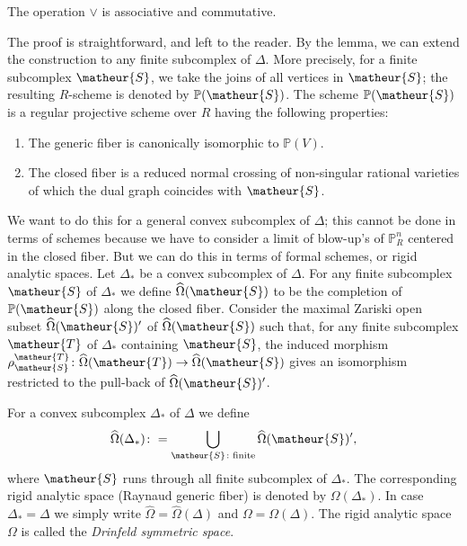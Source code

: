 \begin{applem}
The operation $\vee$ is associative and commutative.
\end{applem}

The proof is straightforward, and left to the reader. 
By the lemma, we can extend the construction to any finite subcomplex of
$\Delta$.
More precisely, for a finite subcomplex $\matheur{S}$, we take the joins 
of all vertices in $\matheur{S}$; the resulting $R$-scheme is denoted by 
$\mathbb{P}(\matheur{S})$.
The scheme $\mathbb{P}(\matheur{S})$ is a regular projective scheme over
$R$ having the following properties:
\begin{enumerate}
\item The generic fiber is canonically isomorphic to $\mathbb{P}(V)$.
\item The closed fiber is a reduced normal crossing of non-singular
      rational varieties of which the dual graph coincides with
      $\matheur{S}$.
\end{enumerate}

We want to do this for a general convex subcomplex of $\Delta$; this cannot 
be done in terms of schemes because we have to consider a limit of
blow-up's of $\mathbb{P}^n_R$ centered in the closed fiber.
But we can do this in terms of formal schemes, or rigid analytic spaces.
Let $\Delta_{\ast}$ be a convex subcomplex of $\Delta$.
For any finite subcomplex $\matheur{S}$ of $\Delta_{\ast}$ we define 
$\widehat{\Omega}(\matheur{S})$ to be the completion of
$\mathbb{P}(\matheur{S})$ along the closed fiber.
Consider the maximal Zariski open subset $\widehat{\Omega}(\matheur{S})'$
of $\widehat{\Omega}(\matheur{S})$ such that, for any finite subcomplex
$\matheur{T}$ of $\Delta_{\ast}$ containing $\matheur{S}$, the induced
morphism $\rho^{\matheur{T}}_{\matheur{S}}\colon\widehat{\Omega}(\matheur{T})
\rightarrow\widehat{\Omega}(\matheur{S})$ gives an isomorphism restricted to 
the pull-back of $\widehat{\Omega}(\matheur{S})'$.

\begin{appdfn}
For a convex subcomplex $\Delta_{\ast}$ of $\Delta$ we define
$$
\widehat{\Omega}(\Delta_{\ast})\colon=\bigcup_{\matheur{S}\colon
\textrm{\scriptsize{finite}}}
\widehat{\Omega}(\matheur{S})',
$$
where $\matheur{S}$ runs through all finite subcomplex of
$\Delta_{\ast}$.
The corresponding rigid analytic space (Raynaud generic fiber) is
denoted by $\Omega(\Delta_{\ast})$.
In case $\Delta_{\ast}=\Delta$ we simply write $\widehat{\Omega}=
\widehat{\Omega}(\Delta)$ and $\Omega=\Omega(\Delta)$.
The rigid analytic space $\Omega$ is called the {\it Drinfeld symmetric
space}.
\end{appdfn}

